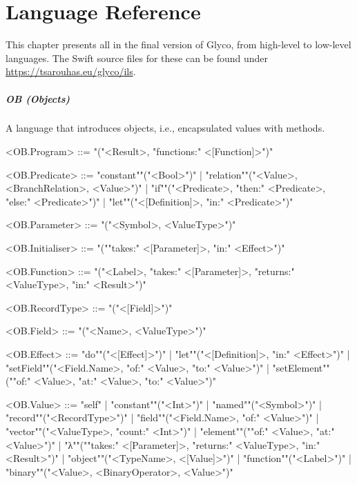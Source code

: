 \documentclass[main.tex]{subfiles}
\begin{document}
\onlyinsubfile{\mainmatter{}\appendix{}}

\chapter{Language Reference}
\label{ch:grammar}
This chapter presents all  in the final version of Glyco, from high-level to low-level languages. The Swift source files for these  can be found under \url{https://tsarouhas.eu/glyco/ils}.

\paragraph{ OB (Objects) } A language that introduces objects, i.e., encapsulated values with methods.
\begin{grammar}
	\footnotesize
				<OB.Program> ::=
							"("<Result>, "functions:" <[Function]>")"
				\par
				<OB.Predicate> ::=
						"constant""("<Bool>")"
						| "relation""("<Value>, <BranchRelation>, <Value>")"
						| "if""("<Predicate>, "then:" <Predicate>, "else:" <Predicate>")"
						| "let""("<[Definition]>, "in:" <Predicate>")"
				\par
				<OB.Parameter> ::=
							"("<Symbol>, <ValueType>")"
				\par
				<OB.Initialiser> ::=
							"(""takes:" <[Parameter]>, "in:" <Effect>")"
				\par
				<OB.Function> ::=
							"("<Label>, "takes:" <[Parameter]>, "returns:" <ValueType>, "in:" <Result>")"
				\par
				<OB.RecordType> ::=
							"("<[Field]>")"
				\par
				<OB.Field> ::=
							"("<Name>, <ValueType>")"
				\par
				<OB.Effect> ::=
						"do""("<[Effect]>")"
						| "let""("<[Definition]>, "in:" <Effect>")"
						| "setField""("<Field.Name>, "of:" <Value>, "to:" <Value>")"
						| "setElement""(""of:" <Value>, "at:" <Value>, "to:" <Value>")"
				\par
				<OB.Value> ::=
						"self"
						| "constant""("<Int>")"
						| "named""("<Symbol>")"
						| "record""("<RecordType>")"
						| "field""("<Field.Name>, "of:" <Value>")"
						| "vector""("<ValueType>, "count:" <Int>")"
						| "element""(""of:" <Value>, "at:" <Value>")"
						| "λ""(""takes:" <[Parameter]>, "returns:" <ValueType>, "in:" <Result>")"
						| "object""("<TypeName>, <[Value]>")"
						| "function""("<Label>")"
						| "binary""("<Value>, <BinaryOperator>, <Value>")"

\end{grammar}
\end{document}

